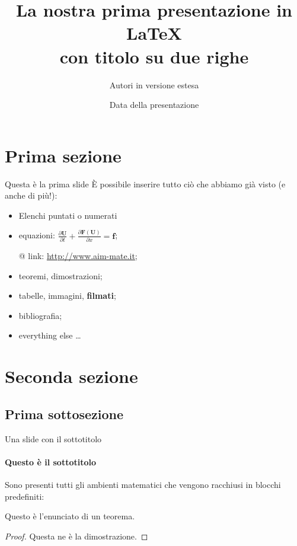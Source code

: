 \documentclass[xcolor={dvipsnames}]{beamer}
\title{La nostra prima presentazione in \LaTeX \\ con titolo su due righe}
\author[Autori sintetici]{Autori in versione estesa}
\date{Data della presentazione}
\institute[Polimi]{Politecnico di Milano}
\begin{document}
\titlepage


\section{Prima sezione}
\begin{frame}{Questa è la prima slide}
    È possibile inserire tutto ciò che abbiamo già visto (e anche di più!):

    \begin{itemize}[<+->] %
     \item Elenchi puntati o numerati
     \item equazioni: $\frac{\partial \mathbf{U}}{\partial t} + \frac{\partial \mathbf{F}(\mathbf{U})}{\partial x} = \mathbf{f}$;
     \item[@] link: \url{http://www.aim-mate.it};
     \item teoremi, dimostrazioni;
     \item tabelle, immagini, \textbf{filmati};
     \item bibliografia;
     \item everything else \ldots
    \end{itemize}


\end{frame}


\section{Seconda sezione}
\subsection{Prima sottosezione}
\begin{frame}{Una slide con il sottotitolo}
\framesubtitle{Questo è il sottotitolo}

    Sono presenti tutti gli ambienti matematici che vengono racchiusi in blocchi predefiniti:

    \begin{theorem}
    \label{teorema:prova}
    Questo è l'enunciato di un teorema.
    \end{theorem}
    \begin{proof}
    Questa ne è la dimostrazione.
    \end{proof}
\end{frame}
\end{document}
